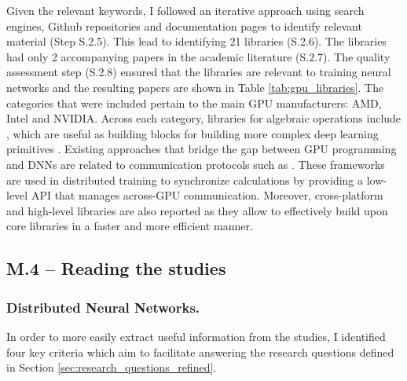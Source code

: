 



Given the relevant keywords, I followed an iterative approach using search engines, Github
repositories and documentation pages to identify relevant material (Step S.2.5). This lead to
identifying 21 libraries (S.2.6). The libraries had only 2 accompanying papers
\cite{chetlur_cudnn_2014,okuta_cupy_2017} in the academic literature (S.2.7). The quality
assessment step (S.2.8) ensured that the libraries are relevant to training neural networks and the
resulting papers are shown in Table \ref{tab:gpu_libraries}. The categories that were included
pertain to the main GPU manufacturers: AMD, Intel and NVIDIA. Across each category, libraries for
algebraic operations include \cite{noauthor_cublas_nodate,noauthor_rocmrocblas_2025,
	noauthor_uxlfoundationonemath_2025}, which are useful as building blocks for building more complex
deep learning primitives
\cite{chetlur_cudnn_2014,noauthor_rocmmiopen_2025,onednn_contributors_oneapi_2025}. Existing
approaches that bridge the gap between GPU programming and DNNs are related to communication
protocols such as
\cite{noauthor_nvidianccl_2025,noauthor_rocmrccl_2025,noauthor_uxlfoundationoneccl_2025}. These
frameworks are used in distributed training to synchronize calculations by providing a low-level
API that manages across-GPU communication. Moreover, cross-platform and high-level libraries are
also reported as they allow to effectively build upon core libraries in a faster and more efficient
manner.

\subsection{M.4 -- Reading the studies}
\label{sec:reading-studies}
\subsubsection{Distributed Neural Networks.}

In order to more easily extract useful information from the studies, I identified four key criteria
which aim to facilitate answering the research questions defined in Section
\ref{sec:research_questions_refined}.

